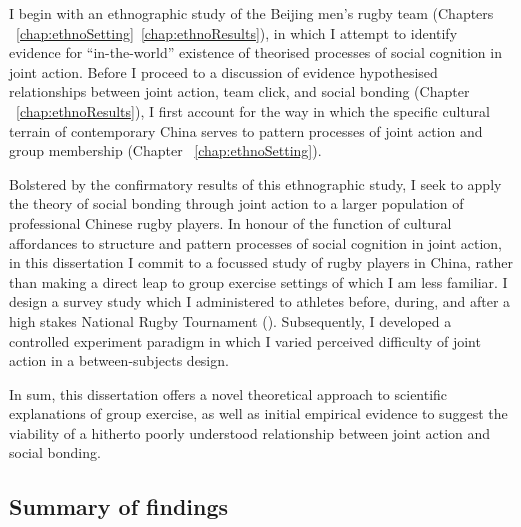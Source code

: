 I begin with an ethnographic study of the Beijing men's rugby team (Chapters ~\ref{chap:ethnoSetting}\nobreakdash~\ref{chap:ethnoResults}), in which I attempt to identify evidence for ``in-the-world'' existence of
theorised processes of social cognition in joint action.  Before I proceed to a discussion of evidence hypothesised relationships between joint action, team click, and social bonding (Chapter ~\ref{chap:ethnoResults}), I first account for the way in which the specific cultural terrain of contemporary China serves to pattern processes of joint action and group membership (Chapter ~\ref{chap:ethnoSetting}).

Bolstered by the confirmatory results of this ethnographic study, I seek to apply the theory of social bonding through joint action to a larger population of professional Chinese rugby players.  In honour of the function of cultural affordances to structure and pattern processes of social cognition in joint action, in this dissertation I commit to a focussed study of rugby players in China, rather than making a direct leap to group exercise settings of which I am less familiar.  I design a survey study which I administered to athletes before, during, and after a high stakes National Rugby Tournament (\citep{chap:}).  Subsequently, I developed a controlled experiment paradigm in which I varied perceived difficulty of joint action in a between-subjects design.

In sum, this dissertation offers a novel theoretical approach to scientific explanations of group exercise, as well as initial empirical evidence to suggest the viability of a hitherto poorly understood relationship between joint action and social bonding.




\subsection{Summary of findings}


